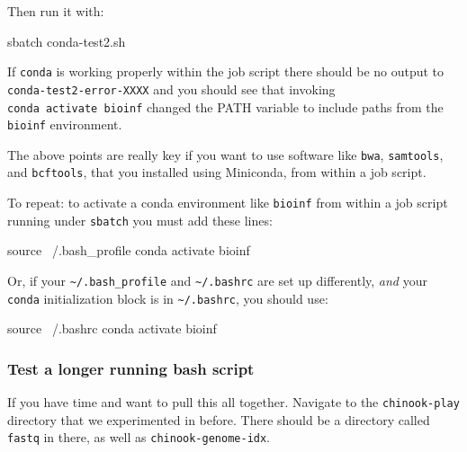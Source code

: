 \documentclass[]{krantz}
\makeatletter
\newenvironment{Shaded}{\begin{snugshade}}{\end{snugshade}}
\newcommand{\BuiltInTok}[1]{#1}
\newcommand{\ExtensionTok}[1]{#1}
\newcommand{\NormalTok}[1]{#1}
\newenvironment{kframe}{%
\medskip{}
\setlength{\fboxsep}{.8em}
 \def\at@end@of@kframe{}%
 \ifinner\ifhmode%
  \def\at@end@of@kframe{\end{minipage}}%
  \begin{minipage}{\columnwidth}%
 \fi\fi%
 \def\FrameCommand##1{\hskip\@totalleftmargin \hskip-\fboxsep
 \colorbox{shadecolor}{##1}\hskip-\fboxsep
     \hskip-\linewidth \hskip-\@totalleftmargin \hskip\columnwidth}%
 \MakeFramed {\advance\hsize-\width
   \@totalleftmargin\z@ \linewidth\hsize
   \@setminipage}}%
 {\par\unskip\endMakeFramed%
 \at@end@of@kframe}
\renewenvironment{Shaded}{\begin{kframe}}{\end{kframe}}
\makeatother
\begin{document}
Then run it with:

\begin{Shaded}
\begin{Highlighting}[]
\ExtensionTok{sbatch}\NormalTok{ conda-test2.sh}
\end{Highlighting}
\end{Shaded}

If \texttt{conda} is working properly within the job script there should be no output
to \texttt{conda-test2-error-XXXX} and you should see that invoking \texttt{conda\ activate\ bioinf}
changed the PATH variable to include paths from the \texttt{bioinf} environment.

The above points are really key if you want to use software like \texttt{bwa}, \texttt{samtools},
and \texttt{bcftools}, that you installed using Miniconda, from within a job script.

To repeat: to activate a conda environment like \texttt{bioinf} from within a job script running
under \texttt{sbatch} you must add these lines:

\begin{Shaded}
\begin{Highlighting}[]
\BuiltInTok{source}\NormalTok{ ~/.bash_profile}
\ExtensionTok{conda}\NormalTok{ activate bioinf}
\end{Highlighting}
\end{Shaded}

Or, if your \texttt{\textasciitilde{}/.bash\_profile} and \texttt{\textasciitilde{}/.bashrc} are set up differently, \emph{and} your
\texttt{conda} initialization block is in \texttt{\textasciitilde{}/.bashrc}, you should use:

\begin{Shaded}
\begin{Highlighting}[]
\BuiltInTok{source}\NormalTok{ ~/.bashrc}
\ExtensionTok{conda}\NormalTok{ activate bioinf}
\end{Highlighting}
\end{Shaded}

\hypertarget{test-a-longer-running-bash-script}{%
\subsubsection{Test a longer running bash script}\label{test-a-longer-running-bash-script}}

If you have time and want to pull this all together. Navigate to the
\texttt{chinook-play} directory that we experimented in before. There should be
a directory called \texttt{fastq} in there, as well as \texttt{chinook-genome-idx}.
\end{document}
